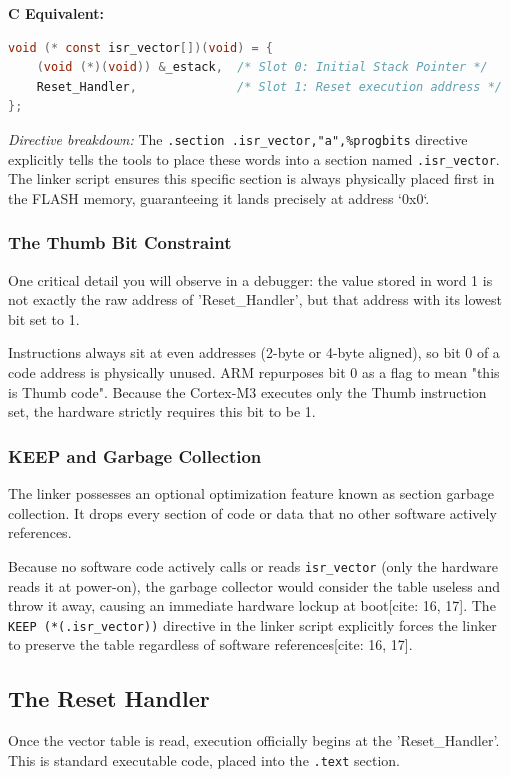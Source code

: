 \textbf{C Equivalent:}
\begin{lstlisting}[language=c]
void (* const isr_vector[])(void) = {
    (void (*)(void)) &_estack,  /* Slot 0: Initial Stack Pointer */
    Reset_Handler,              /* Slot 1: Reset execution address */
};
\end{lstlisting}

\textit{Directive breakdown:} The \texttt{.section .isr\_vector,"a",\%progbits} directive explicitly tells the tools to place these words into a section named \texttt{.isr\_vector}. The linker script ensures this specific section is always physically placed first in the FLASH memory, guaranteeing it lands precisely at address `0x0`.

\subsubsection{The Thumb Bit Constraint}
One critical detail you will observe in a debugger: the value stored in word 1 is not exactly the raw address of 'Reset\_Handler', but that address with its lowest bit set to 1.

Instructions always sit at even addresses (2-byte or 4-byte aligned), so bit 0 of a code address is physically unused. ARM repurposes bit 0 as a flag to mean "this is Thumb code". Because the Cortex-M3 executes only the Thumb instruction set, the hardware strictly requires this bit to be 1.

\subsubsection{KEEP and Garbage Collection}
The linker possesses an optional optimization feature known as section garbage collection. It drops every section of code or data that no other software actively references. 

Because no software code actively calls or reads \texttt{isr\_vector} (only the hardware reads it at power-on), the garbage collector would consider the table useless and throw it away, causing an immediate hardware lockup at boot[cite: 16, 17]. The \texttt{KEEP (*(.isr\_vector))} directive in the linker script explicitly forces the linker to preserve the table regardless of software references[cite: 16, 17].

\subsection{The Reset Handler}
Once the vector table is read, execution officially begins at the 'Reset\_Handler'. This is standard executable code, placed into the \texttt{.text} section.

